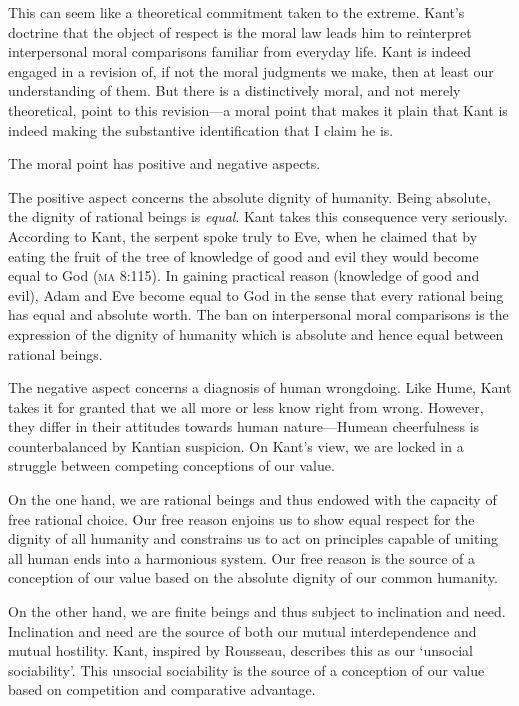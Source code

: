 \documentclass[12pt]{article}
\begin{document}
This can seem like a theoretical commitment taken to the extreme. Kant's doctrine that the object of respect is the moral law leads him to reinterpret interpersonal moral comparisons familiar from everyday life. Kant is indeed engaged in a revision of, if not the moral judgments we make, then at least our understanding of them. But there is a distinctively moral, and not merely theoretical, point to this revision---a moral point that makes it plain that Kant is indeed making the substantive identification that I claim he is.

The moral point has positive and negative aspects.

The positive aspect concerns the absolute dignity of humanity. Being absolute, the dignity of rational beings is \emph{equal}. Kant takes this consequence very seriously. According to Kant, the serpent spoke truly to Eve, when he claimed that by eating the fruit of the tree of knowledge of good and evil they would become equal to God (\textsc{ma} 8:115). In gaining practical reason (knowledge of good and evil), Adam and Eve become equal to God in the sense that every rational being has equal and absolute worth. The ban on interpersonal moral comparisons is the expression of the dignity of humanity which is absolute and hence equal between rational beings.

The negative aspect concerns a diagnosis of human wrongdoing. Like Hume, Kant takes it for granted that we all more or less know right from wrong. However, they differ in their attitudes towards human nature---Humean cheerfulness is counterbalanced by Kantian suspicion. On Kant's view, we are locked in a struggle between competing conceptions of our value. 

On the one hand, we are rational beings and thus endowed with the capacity of free rational choice. Our free reason enjoins us to show equal respect for the dignity of all humanity and constrains us to act on principles capable of uniting all human ends into a harmonious system. Our free reason is the source of a conception of our value based on the absolute dignity of our common humanity. 

On the other hand, we are finite beings and thus subject to inclination and need. Inclination and need are the source of both our mutual interdependence and mutual hostility. Kant, inspired by Rousseau, describes this as our `unsocial sociability'. This unsocial sociability is the source of a conception of our value based on competition and comparative advantage. 
\end{document}
